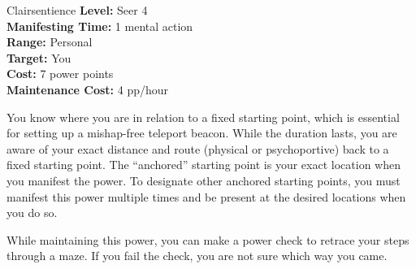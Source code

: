 {Clairsentience}
{
	\textbf{Level:}
	Seer 4\\
	\textbf{Manifesting Time:}
	1 mental action\\
	\textbf{Range:}
	Personal\\
	\textbf{Target:}
	You\\
	\textbf{Cost:}
	7 power points\\
	\textbf{Maintenance Cost:}
	4 pp/hour\\
}
{
	You know where you are in relation to a fixed starting point, which is essential for setting up a mishap-free teleport beacon. While the duration lasts, you are aware of your exact distance and route (physical or psychoportive) back to a fixed starting point. The ``anchored'' starting point is your exact location when you manifest the power. To designate other anchored starting points, you must manifest this power multiple times and be present at the desired locations when you do so.

	While maintaining this power, you can make a power check to retrace your steps through a maze. If you fail the check, you are not sure which way you came.
}